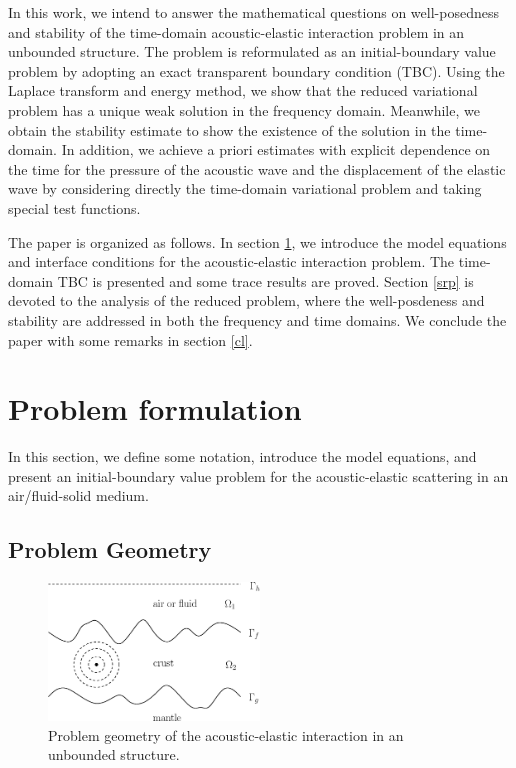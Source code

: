 \documentclass[final,leqno]{siamltex}
\begin{document}
In this work, we intend to answer the mathematical questions on well-posedness
and stability of the time-domain acoustic-elastic interaction problem in an
unbounded structure. The problem is reformulated as an initial-boundary value
problem by adopting an exact transparent boundary condition (TBC). Using the
Laplace transform and energy method, we show that the reduced variational
problem has a unique weak solution in the frequency domain. Meanwhile, we obtain
the stability estimate to show the existence of the solution in the
time-domain. In addition, we achieve a priori estimates with explicit
dependence on the time for the pressure of the acoustic wave and
the displacement of the elastic wave by considering directly the time-domain
variational problem and taking special test functions.

The paper is organized as follows. In section \ref{PF}, we introduce the model
equations and interface conditions for the acoustic-elastic interaction problem.
The time-domain TBC is presented and some trace results are proved. Section
\ref{srp} is devoted to the analysis of the reduced problem, where the
well-posdeness and stability are addressed in both the frequency and time
domains. We conclude the paper with some remarks  in section \ref{cl}.

\section{Problem formulation}\label{PF}

In this section, we define some notation, introduce the model equations, and
present an initial-boundary value problem for the acoustic-elastic
scattering in an air/fluid-solid medium.

\subsection {Problem Geometry}

\begin{figure}
\centering
\includegraphics[width=0.5\textwidth]{pg}
\caption{Problem geometry of the acoustic-elastic interaction in an unbounded
structure.}
\label{pg}
\end{figure}
\end{document}

